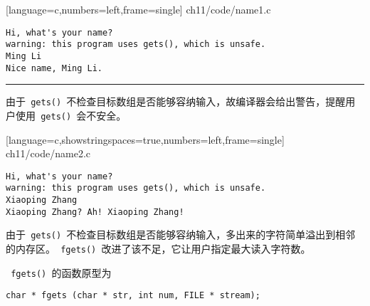 \begin{frame}[fragile] 

[language=c,numbers=left,frame=single]
{ch11/code/name1.c}
\end{frame}

\begin{frame}[fragile] 
\begin{lstlisting}[]
Hi, what's your name?
warning: this program uses gets(), which is unsafe.
Ming Li
Nice name, Ming Li.
\end{lstlisting}

\rule{\textwidth}{0.3mm} \pause \vspace{.1in}
由于\lstinline| gets() |不检查目标数组是否能够容纳输入，故编译器会给出警告，提醒用户使用\lstinline| gets() |会不安全。
\end{frame}

\begin{frame}[fragile] 

[language=c,showstringspaces=true,numbers=left,frame=single]
{ch11/code/name2.c}
\end{frame}

\begin{frame}[fragile] 
\begin{lstlisting}[]
Hi, what's your name?
warning: this program uses gets(), which is unsafe.
Xiaoping Zhang
Xiaoping Zhang? Ah! Xiaoping Zhang!
\end{lstlisting}
\end{frame}


\begin{frame}[fragile] 
由于\lstinline| gets() |不检查目标数组是否能够容纳输入，多出来的字符简单溢出到相邻的内存区。\lstinline| fgets() |改进了该不足，它让用户指定最大读入字符数。\vspace{.1in}

\lstinline| fgets() |的函数原型为
\begin{lstlisting}
char * fgets (char * str, int num, FILE * stream);
\end{lstlisting}
\end{frame}

